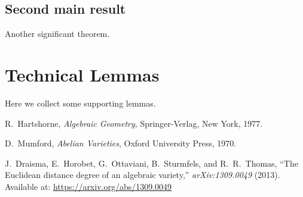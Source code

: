 \documentclass[12pt,reqno]{amsbook}
\theoremstyle{definition}
\begin{document}
\section{Second main result}
Another significant theorem.

\appendix
\chapter{Technical Lemmas}
Here we collect some supporting lemmas.

\begin{thebibliography}{9}


R.~Hartshorne, \emph{Algebraic Geometry}, Springer-Verlag, New York, 1977.

D.~Mumford, \emph{Abelian Varieties}, Oxford University Press, 1970.

J.~Draisma, E.~Horobet, G.~Ottaviani, B.~Sturmfels, and R.~R.~Thomas, 
``The Euclidean distance degree of an algebraic variety,'' 
\emph{arXiv:1309.0049} (2013).  
Available at: \href{https://arxiv.org/abs/1309.0049}{https://arxiv.org/abs/1309.0049}

\end{thebibliography}
\end{document}
